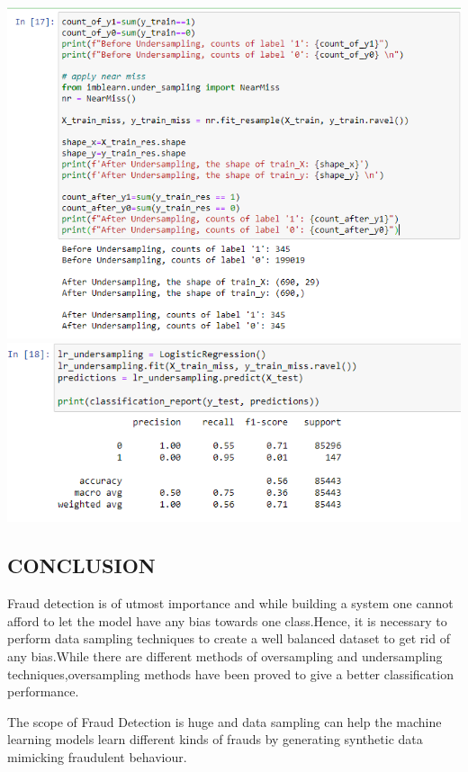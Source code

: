 \documentclass[a4paper, 12pt]{article}
\begin{document}
\includegraphics[width=\linewidth]{./undersampling}
\hline
\includegraphics[width=\linewidth]{./performance_after_undersampling}
\newpage
\begin{center}
\section{CONCLUSION}
\end{center}
\par
Fraud detection is of utmost importance and while building a system one cannot afford to let the model have any bias towards one class.Hence, it is necessary to perform data sampling techniques to create a well balanced dataset to get rid of any bias.While there are different methods of oversampling and undersampling techniques,oversampling methods have been proved to give a better classification performance.
\par
The scope of Fraud Detection is huge and data sampling can help the machine learning models learn different kinds of frauds by generating synthetic data mimicking fraudulent behaviour.
\\
\end{document}
